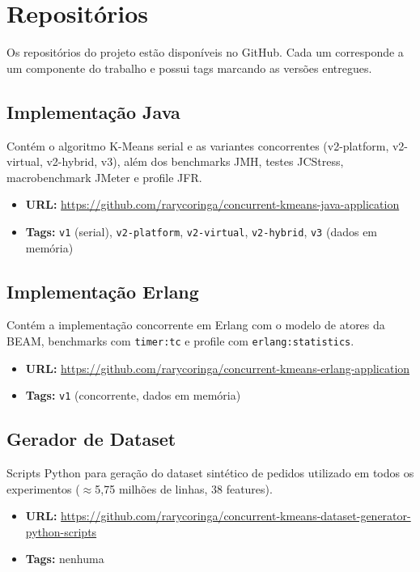 \section{Repositórios}

Os repositórios do projeto estão disponíveis no GitHub. Cada um corresponde a um
componente do trabalho e possui tags marcando as versões entregues.

\subsection*{Implementação Java}

Contém o algoritmo K-Means serial e as variantes concorrentes (v2-platform,
v2-virtual, v2-hybrid, v3), além dos benchmarks JMH, testes JCStress, macrobenchmark
JMeter e profile JFR.

\begin{itemize}
    \item \textbf{URL:} \url{https://github.com/rarycoringa/concurrent-kmeans-java-application}
    \item \textbf{Tags:} \texttt{v1} (serial), \texttt{v2-platform}, \texttt{v2-virtual},
          \texttt{v2-hybrid}, \texttt{v3} (dados em memória)
\end{itemize}

\subsection*{Implementação Erlang}

Contém a implementação concorrente em Erlang com o modelo de atores da BEAM,
benchmarks com \texttt{timer:tc} e profile com \texttt{erlang:statistics}.

\begin{itemize}
    \item \textbf{URL:} \url{https://github.com/rarycoringa/concurrent-kmeans-erlang-application}
    \item \textbf{Tags:} \texttt{v1} (concorrente, dados em memória)
\end{itemize}

\subsection*{Gerador de Dataset}

Scripts Python para geração do dataset sintético de pedidos utilizado em todos os
experimentos ($\approx$5{,}75 milhões de linhas, 38 features).

\begin{itemize}
    \item \textbf{URL:} \url{https://github.com/rarycoringa/concurrent-kmeans-dataset-generator-python-scripts}
    \item \textbf{Tags:} nenhuma
\end{itemize}
